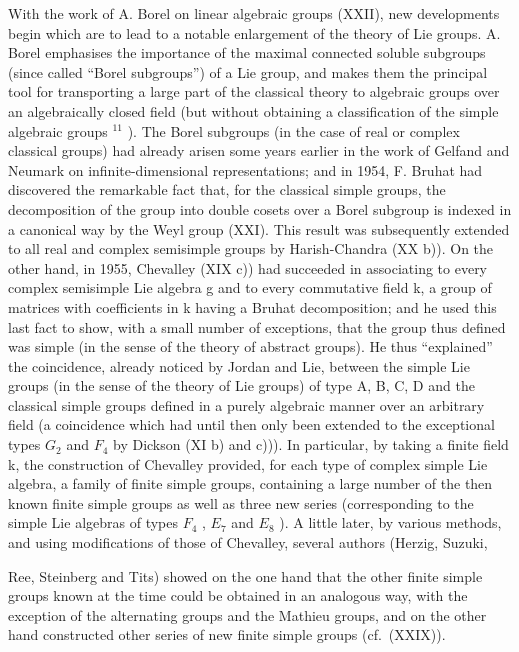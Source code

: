 With the work of A. Borel on linear algebraic groups (XXII), new developments begin which are to lead to a notable enlargement of the theory of Lie groups. A. Borel emphasises the importance of the maximal connected soluble subgroups (since called ``Borel subgroups'') of a Lie group, and makes them the principal tool for transporting a large part of the classical theory to algebraic groups over an algebraically closed field (but without obtaining a classification of the simple algebraic groups \(^{11}\) ). The Borel subgroups (in the case of real or complex classical groups) had already arisen some years earlier in the work of Gelfand and Neumark on infinite-dimensional representations; and in 1954, F. Bruhat had discovered the remarkable fact that, for the classical simple groups, the decomposition of the group into double cosets over a Borel subgroup is indexed in a canonical way by the Weyl group (XXI). This result was subsequently extended to all real and complex semisimple groups by Harish-Chandra (XX b)). On the other hand, in 1955, Chevalley (XIX c)) had succeeded in associating to every complex semisimple Lie algebra g and to every commutative field k, a group of matrices with coefficients in k having a Bruhat decomposition; and he used this last fact to show, with a small number of exceptions, that the group thus defined was simple (in the sense of the theory of abstract groups). He thus ``explained'' the coincidence, already noticed by Jordan and Lie, between the simple Lie groups (in the sense of the theory of Lie groups) of type A, B, C, D and the classical simple groups defined in a purely algebraic manner over an arbitrary field (a coincidence which had until then only been extended to the exceptional types \(G_{2}\) and \(F_{4}\) by Dickson (XI b) and c))). In particular, by taking a finite field k, the construction of Chevalley provided, for each type of complex simple Lie algebra, a family of finite simple groups, containing a large number of the then known finite simple groups as well as three new series (corresponding to the simple Lie algebras of types \(F_{4}\) , \(E_{7}\) and \(E_{8}\) ). A little later, by various methods, and using modifications of those of Chevalley, several authors (Herzig, Suzuki,

Ree, Steinberg and Tits) showed on the one hand that the other finite simple groups known at the time could be obtained in an analogous way, with the exception of the alternating groups and the Mathieu groups, and on the other hand constructed other series of new finite simple groups (cf.~(XXIX)).

